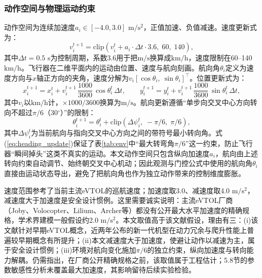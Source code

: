 \documentclass[12pt,a4paper,UTF8]{ctexart}
\begin{document}
\subsubsection{动作空间与物理运动约束}

动作空间为连续加速度$a_i\in[-4.0, 3.0]$ $\mathrm{m/s^2}$，正值加速、负值减速。速度更新式为：
\begin{equation}
    v_i^{t+1} = \text{clip}\!\left(v_i^{t} + a_i \cdot \Delta t \cdot 3.6,\; 60,\; 140\right),
    \label{eq:velocity_update}
\end{equation}
其中$\Delta t=0.5$ s为控制周期，系数3.6用于把$\mathrm{m/s}$换算成$\mathrm{km/h}$，速度限制在60--140 $\mathrm{km/h}$。飞行器在二维平面内的运动由位置、速度与航向刻画。航向角$\theta_i$定义为速度方向与$x$轴正方向的夹角，速度分解为$v_i[\cos\theta_i,\ \sin\theta_i]^{\top}$。位置更新式为：
\begin{equation}
    x_i^{t+1} = x_i^{t} + v_i^{t+1}\,\frac{1000}{3600}\,\cos\theta_i^{t}\,\Delta t,\qquad
    y_i^{t+1} = y_i^{t} + v_i^{t+1}\,\frac{1000}{3600}\,\sin\theta_i^{t}\,\Delta t,
    \label{eq:position_update}
\end{equation}
其中$v_i$以$\mathrm{km/h}$计，$\times1000/3600$换算为$\mathrm{m/s}$。航向更新遵循“单步向交叉中心方向转向不超过$\pi/6$（30$^{\circ}$）”的限制：
\begin{equation}
    \theta_i^{t+1} = \theta_i^{t} + \text{clip}\!\left(\Delta\psi_i^{t},\; -\pi/6,\; \pi/6\right),
    \label{eq:heading_update}
\end{equation}
其中$\Delta\psi_i^{t}$为当前航向与指向交叉中心方向之间的带符号最小转向角。式(\ref{eq:heading_update})保证了表\ref{tab:env}中“最大转弯角$\pi/6$”这一约束，防止飞行器“瞬间掉头”这类不真实的运动。本文动作空间只包含纵向加速度$a_i$，航向由上述转向约束自动调节、始终朝交叉中心机动；因此观测与门控公式中使用的航向角$\theta_i$直接由运动状态导出，避免了把航向角也作为独立动作带来的控制维度膨胀。

速度范围参考了当前主流eVTOL的巡航速度；加速度取3.0、减速度取4.0 $\mathrm{m/s^2}$，减速度大于加速度是安全设计惯例。这里需要诚实说明：主流eVTOL厂商（Joby、Volocopter、Lilium、Archer等）都没有公开最大水平加速度的精确规格，学术界建模一般假设约2.0 $\mathrm{m/s^2}$\cite{ref25}。本文取值高于该文献假设，理由有三：(i)该文献针对早期eVTOL概念，近两年公布的新一代机型在动力冗余与爬升性能上普遍较早期概念有所提升；(ii)本文减速度大于加速度，使避让动作以减速为主，属于安全设计惯例；(iii)环境对航向变化施加$\pi/6$的独立约束，纵向加速度与转向能力解耦。仍需指出，在厂商公开精确规格之前，该取值属于工程估计；5.8节的参数敏感性分析未覆盖最大加速度，其影响留待后续实验检验。
\end{document}
